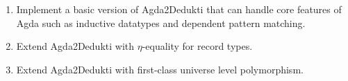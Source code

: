 


\begin{enumerate}
  \item Implement a basic version of Agda2Dedukti that can handle core
  features of Agda such as inductive datatypes and dependent pattern
  matching.
  \item Extend Agda2Dedukti with $\eta$-equality for record types.
  \item Extend Agda2Dedukti with first-class universe level polymorphism.
\end{enumerate}




